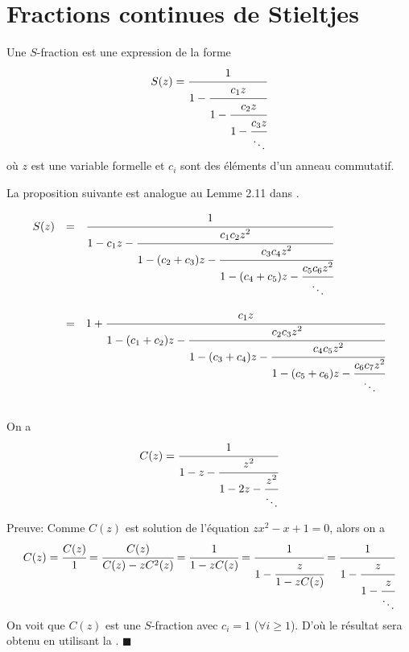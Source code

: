 \section{Fractions continues de Stieltjes}
\begin{definition}
	\begin{rm}
		Une $S$-fraction est une expression de la forme
		\[
			S(z)=\cfrac{1}{1-\cfrac{c_{1}z}{1-\cfrac{c_{2}z}{1-\cfrac{c_{3}z}{\ddots}}}}
		\]
		où $z$ est une variable formelle et $c_{i}$ sont des éléments d'un anneau commutatif.
	\end{rm}
\end{definition}
La proposition suivante est analogue au Lemme 2.11 dans \cite{ref30}.
\begin{proposition}\label{j-frac}
	\begin{rm}
		\[
			\begin{array}{l l l}

				S(z) & =       & \cfrac{1}{1-c_{1}z-\cfrac{c_{1}c_{2}z^2}{1-(c_{2}+c_{3})z-\cfrac{c_{3}c_{4}z^2}{1-(c_{4}+c_{5})z-\cfrac{c_{5}c_{6}z^2}{\ddots}}}}                \\
				     & \text{} &                                                                                                                                                  \\

				     & =       & 1+\cfrac{c_{1}z}{1-(c_{1}+c_{2})z-\cfrac{c_{2}c_{3}z^2}{1-(c_{3}+c_{4})z-\cfrac{c_{4}c_{5}z^2}{1-(c_{5}+c_{6})z-\cfrac{c_{6}c_{7}z^2}{\ddots}}}} \\
				     & \text{} &
			\end{array}
		\]
	\end{rm}
\end{proposition}

\begin{proposition}\label{cat-frac}
	On a
	\[C(z) = \cfrac{1}{1-z-\cfrac{z^2}{1-2z-\cfrac{z^2}{\ddots}}} \]
\end{proposition}
Preuve:
Comme $C(z)$ est solution de l'équation $zx^{2} - x +1 =0$, alors on a
\[
	C(z) = \cfrac{C(z)}{1}=\cfrac{C(z)}{C(z)-zC^2(z)}=\cfrac{1}{1-zC(z)}= \cfrac{1}{1-\cfrac{z}{1-zC(z)}} = \cfrac{1}{1-\cfrac{z}{1-\cfrac{z}{\ddots}}}
\]
On voit que $C(z)$ est une $S$-fraction avec $c_{i}=1$ ($\forall i \geq 1$).
D'où le résultat sera obtenu en utilisant la . \hspace{10pt} $\blacksquare$

